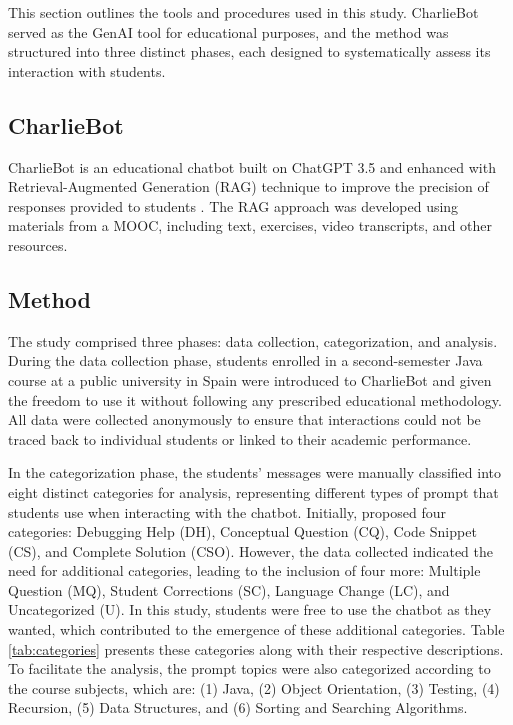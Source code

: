 \documentclass[a4paper,twoside]{article}
\begin{document}
This section outlines the tools and procedures used in this study. CharlieBot
served as the GenAI tool for educational purposes, and the method was structured
into three distinct phases, each designed to systematically assess its
interaction with students.

\subsection{CharlieBot}

CharlieBot is an educational chatbot built on ChatGPT 3.5 and enhanced with
Retrieval-Augmented Generation (RAG) technique to improve the precision of
responses provided to students \citep{Sun24}. The RAG approach was developed
using materials from a MOOC, including text, exercises, video transcripts, and
other resources.

\subsection{Method}

The study comprised three phases: data collection, categorization, and analysis.
During the data collection phase, students enrolled in a second-semester Java
course at a public university in Spain were introduced to CharlieBot and given
the freedom to use it without following any prescribed educational methodology.
All data were collected anonymously to ensure that interactions could not be
traced back to individual students or linked to their academic performance.

In the categorization phase, the students' messages were manually classified
into eight distinct categories for analysis, representing different types of
prompt that students use when interacting with the chatbot. Initially,
\cite{Ghimire24} proposed four categories: Debugging Help (DH), Conceptual
Question (CQ), Code Snippet (CS), and Complete Solution (CSO). However, the data
collected indicated the need for additional categories, leading to the inclusion
of four more: Multiple Question (MQ), Student Corrections (SC), Language Change
(LC), and Uncategorized (U). In this study, students were free to use the
chatbot as they wanted, which contributed to the emergence of these additional
categories. Table \ref{tab:categories} presents these categories along with
their respective descriptions. To facilitate the analysis, the prompt topics
were also categorized according to the course subjects, which are: (1) Java, (2)
Object Orientation, (3) Testing, (4) Recursion, (5) Data Structures, and (6)
Sorting and Searching Algorithms.
\end{document}
